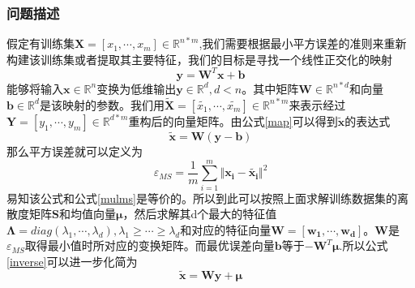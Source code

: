 \documentclass[10pt,a4paper]{article}
\begin{document}
\begin{CJK*}{UTF8}{song}
\subsubsection{问题描述}
假定有训练集$\mathbf{X}=[x_1,\cdots,x_m]\in \mathbb{R}^{n*m}$,我们需要根据最小平方误差的准则来重新构建该训练集或者提取其主要特征，我们的目标是寻找一个线性正交化的映射
\begin{equation}
\label{map}
\boldsymbol{y}=\mathbf{W}^T\boldsymbol{x}+\boldsymbol{b}
\end{equation}
能够将输入$\boldsymbol{x} \in \mathbb{R}^n$变换为低维输出$\boldsymbol{y} \in \mathbb{R}^d,d<n$。其中矩阵$\mathbf{W} \in \mathbb{R}^{n*d}$和向量$\boldsymbol{b} \in  \mathbb{R}^d$是该映射的参数。我们用$\tilde{\mathbf{X}}=[\tilde{x_1},\cdots,\tilde{x_m}]\in \mathbb{R}^{n*m}$来表示经过$\mathbf{Y}=[y_1,\cdots,y_m]\in \mathbb{R}^{d*m}$重构后的向量矩阵。由公式\ref{map}可以得到$\tilde{\boldsymbol{x}}$的表达式
\begin{equation}
\label{inverse}
\tilde{\boldsymbol{x}}=\mathbf{W}(\boldsymbol{y}-\boldsymbol{b})
\end{equation}
那么平方误差就可以定义为
\begin{equation}
\varepsilon_{MS}=\frac{1}{m}\sum_{i=1}^{m}\Vert \boldsymbol{x_i}-\tilde{\boldsymbol{x_i}} \Vert^2
\end{equation}
易知该公式和公式\ref{mulms}是等价的。所以到此可以按照上面求解训练数据集的离散度矩阵$\mathbf{S}$和均值向量$\boldsymbol{\mu}$，然后求解其d个最大的特征值$\mathbf{\Lambda}=diag(\lambda_1,\cdots,\lambda_d),\lambda_1\geqslant\cdots\geqslant\lambda_d$和对应的特征向量$\mathbf{W}=[\boldsymbol{w_1},\cdots,\boldsymbol{w_{d}}]$。$\mathbf{W}$是$\varepsilon_{MS}$取得最小值时所对应的变换矩阵。而最优误差向量$\boldsymbol{b}$等于$-\mathbf{W}^T\boldsymbol{\mu}$.所以公式\ref{inverse}可以进一步化简为
\begin{equation}
\tilde{\boldsymbol{x}}=\mathbf{W}\boldsymbol{y}+\boldsymbol{\mu}
\end{equation}


\end{CJK*}
\end{document}
